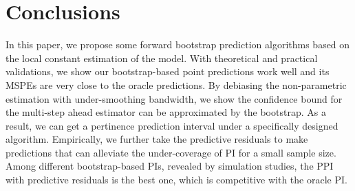 \documentclass[a4paper]{article}
\begin{document}
\section{Conclusions}\label{Sec:conclusion}
In this paper, we propose some forward bootstrap prediction algorithms based on the local constant estimation of the model. With theoretical and practical validations, we show our bootstrap-based point predictions work well and its MSPEs are very close to the oracle predictions. By debiasing the non-parametric estimation with under-smoothing bandwidth, we show the confidence bound for the multi-step ahead estimator can be approximated by the bootstrap. As a result, we can get a pertinence prediction interval under a specifically designed algorithm. Empirically, we further take the predictive residuals to make predictions that can alleviate the under-coverage of PI for a small sample size. Among different bootstrap-based PIs, revealed by simulation studies, the PPI with predictive residuals is the best one, which is competitive with the oracle PI.


\newpage
\newpage



\clearpage
\appendix
\end{document}

